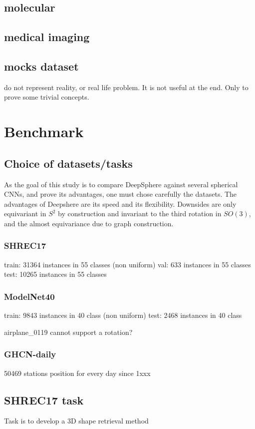 \documentclass[11pt]{report}
\begin{document}
\section{molecular}

\section{medical imaging}

\section{mocks dataset}
do not represent reality, or real life problem. It is not useful at the end. Only to prove some trivial concepts.

\chapter{Benchmark}

\section{Choice of datasets/tasks}
As the goal of this study is to compare DeepSphere against several spherical CNNs, and prove its advantages, one must chose carefully the datasets. The advantages of Deepshere are its speed and its flexibility. Downsides are only equivariant in $S^2$ by construction and invariant to the third rotation in $SO(3)$, and the almost equivariance due to graph construction.
\subsection{SHREC17}
train: 31364 instances in 55 classes (non uniform)
val: 633 instances in 55 classes
test: 10265 instances in 55 classes
\subsection{ModelNet40}
train: 9843 instances in 40 class (non uniform)
test: 2468 instances in 40 class

airplane\_0119 cannot support a rotation?
\subsection{GHCN-daily}
50469 stations position for every day since 1xxx
\section{SHREC17 task}
Task is to develop a 3D shape retrieval method
\end{document}
